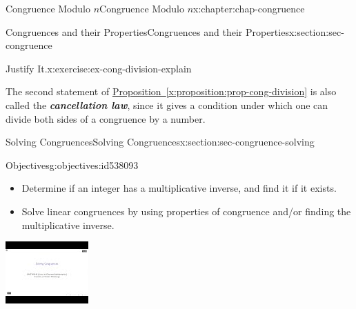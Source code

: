 \documentclass[oneside,10pt,]{book}
\newcommand{\xreffont}{\relax}
\newcommand{\alert}[1]{\textbf{\textit{#1}}}
\numberwithin{equation}{section}
\newlength{\qrsize}
\newlength{\previewwidth}
\begin{document}
\begin{chapterptx}{Congruence Modulo \(n\)}{}{Congruence Modulo \(n\)}{}{}{x:chapter:chap-congruence}
\begin{sectionptx}{Congruences and their Properties}{}{Congruences and their Properties}{}{}{x:section:sec-congruence}
\begin{inlineexercise}{Justify It.}{x:exercise:ex-cong-division-explain}
\end{inlineexercise}%
The second statement of \hyperref[x:proposition:prop-cong-division]{Proposition~{\xreffont\ref{x:proposition:prop-cong-division}}} is also called the \alert{cancellation law}, since it gives a condition under which one can divide both sides of a congruence by a number.%
\end{sectionptx}
%
%
\typeout{************************************************}
\typeout{************************************************}
%
\begin{sectionptx}{Solving Congruences}{}{Solving Congruences}{}{}{x:section:sec-congruence-solving}
\begin{objectives}{Objectives}{g:objectives:id538093}
%
\begin{itemize}[label=\textbullet]
\item{}Determine if an integer has a multiplicative inverse, and find it if it exists.%
\item{}Solve linear congruences by using properties of congruence and\slash{}or finding the multiplicative inverse.%
\end{itemize}
\end{objectives}
\begin{sidebyside}{1}{0}{0}{0}%
\begin{sbspanel}{1}%
\setlength{\qrsize}{9em}
\setlength{\previewwidth}{\linewidth}
\addtolength{\previewwidth}{-\qrsize}
\begin{tcbraster}[raster columns=2, raster column skip=1pt, raster halign=center, raster force size=false, raster left skip=0pt, raster right skip=0pt]%
\begin{tcolorbox}[previewstyle, width=\previewwidth]%
\includegraphics[width=0.80\linewidth,height=\qrsize,keepaspectratio]{images/video-solving-congruences.jpg}%

\end{tcolorbox}
\end{tcbraster}
\end{sbspanel}
\end{sidebyside}
\end{sectionptx}
\end{chapterptx}
\end{document}
